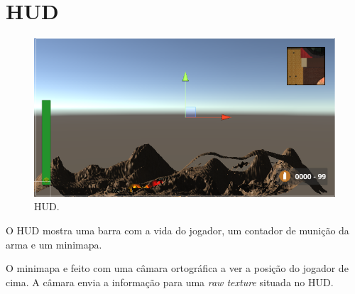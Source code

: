 \documentclass{article}
\begin{document}
    \section*{HUD}
        \begin{figure}[h]\begin{center}
            \includegraphics[scale=0.4]{Screenshot_3.png}
            \caption{HUD.}
        \end{center}\end{figure}
        \par
        O HUD mostra uma barra com a vida do jogador, um contador de munição da arma e um minimapa.
        \par
        O minimapa e feito com uma câmara ortográfica a ver a posição do jogador de cima. A câmara envia a informação para uma \textit{raw texture} situada no HUD.
\end{document}
